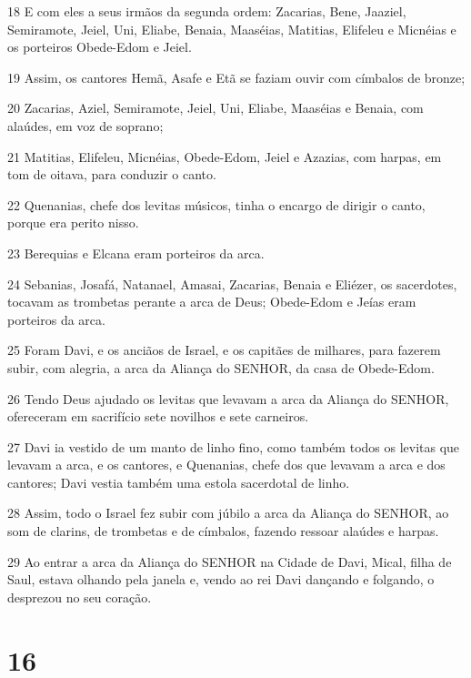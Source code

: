\par 18 E com eles a seus irmãos da segunda ordem: Zacarias, Bene, Jaaziel, Semiramote, Jeiel, Uni, Eliabe, Benaia, Maaséias, Matitias, Elifeleu e Micnéias e os porteiros Obede-Edom e Jeiel.
\par 19 Assim, os cantores Hemã, Asafe e Etã se faziam ouvir com címbalos de bronze;
\par 20 Zacarias, Aziel, Semiramote, Jeiel, Uni, Eliabe, Maaséias e Benaia, com alaúdes, em voz de soprano;
\par 21 Matitias, Elifeleu, Micnéias, Obede-Edom, Jeiel e Azazias, com harpas, em tom de oitava, para conduzir o canto.
\par 22 Quenanias, chefe dos levitas músicos, tinha o encargo de dirigir o canto, porque era perito nisso.
\par 23 Berequias e Elcana eram porteiros da arca.
\par 24 Sebanias, Josafá, Natanael, Amasai, Zacarias, Benaia e Eliézer, os sacerdotes, tocavam as trombetas perante a arca de Deus; Obede-Edom e Jeías eram porteiros da arca.
\par 25 Foram Davi, e os anciãos de Israel, e os capitães de milhares, para fazerem subir, com alegria, a arca da Aliança do SENHOR, da casa de Obede-Edom.
\par 26 Tendo Deus ajudado os levitas que levavam a arca da Aliança do SENHOR, ofereceram em sacrifício sete novilhos e sete carneiros.
\par 27 Davi ia vestido de um manto de linho fino, como também todos os levitas que levavam a arca, e os cantores, e Quenanias, chefe dos que levavam a arca e dos cantores; Davi vestia também uma estola sacerdotal de linho.
\par 28 Assim, todo o Israel fez subir com júbilo a arca da Aliança do SENHOR, ao som de clarins, de trombetas e de címbalos, fazendo ressoar alaúdes e harpas.
\par 29 Ao entrar a arca da Aliança do SENHOR na Cidade de Davi, Mical, filha de Saul, estava olhando pela janela e, vendo ao rei Davi dançando e folgando, o desprezou no seu coração.

\chapter{16}

